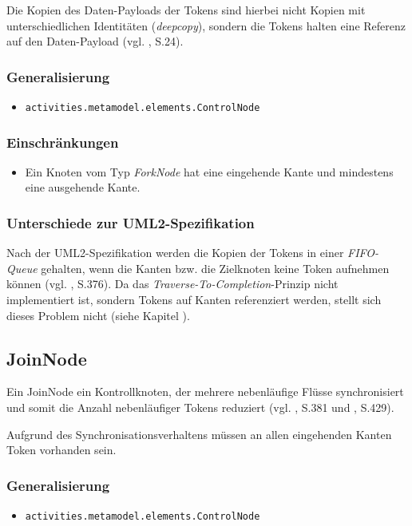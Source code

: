 Die Kopien des Daten-Payloads der Tokens sind hierbei nicht Kopien mit unterschiedlichen Identitäten (\emph{deepcopy}), sondern die Tokens halten eine Referenz auf den Daten-Payload (vgl. \citep{Crane2009}, S.24).

\subsubsection{Generalisierung}
\begin{itemize}
\item \texttt{activities.metamodel.elements.ControlNode}
\end{itemize}

\subsubsection{Einschränkungen}
\begin{itemize}
\item Ein Knoten vom Typ \emph{ForkNode} hat eine eingehende Kante und mindestens eine ausgehende Kante.
\end{itemize}

\subsubsection{Unterschiede zur UML2-Spezifikation}
Nach der UML2-Spezifikation werden die Kopien der Tokens in einer \emph{FIFO-Queue} gehalten, wenn die Kanten bzw. die Zielknoten keine Token aufnehmen können (vgl. \citep{OMG2009}, S.376). Da das \emph{Traverse-To-Completion}-Prinzip nicht implementiert ist, sondern Tokens auf Kanten referenziert werden, stellt sich dieses Problem nicht (siehe Kapitel ).


\subsection{JoinNode}
\label{meta-join}
Ein JoinNode ein Kontrollknoten, der mehrere nebenläufige Flüsse synchronisiert und somit die Anzahl nebenläufiger Tokens reduziert (vgl. \citep{OMG2009}, S.381 und \citep{RumbaughJacobsonBooch2005}, S.429).

Aufgrund des Synchronisationsverhaltens müssen an allen eingehenden Kanten Token vorhanden sein.

\subsubsection{Generalisierung}
\begin{itemize}
\item \texttt{activities.metamodel.elements.ControlNode}
\end{itemize}

